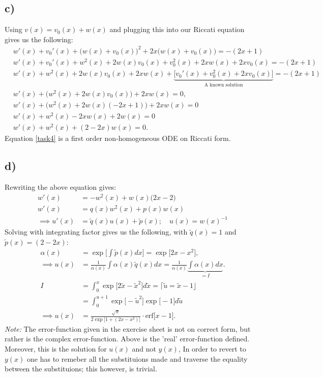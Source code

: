 \documentclass[]{article}
\begin{document}
\subsection*{c)}
Using $v(x) = v_0(x) + w(x)$ and plugging this into our Riccati equation gives us the following:
\begin{align}
    &w'(x) + v_0'(x) + \big(w(x) + v_0(x)\big)^2 + 2x\big(w(x) + v_0(x)\big) = -(2x+1)\nonumber\\
    &w'(x) + v_0'(x) + w^2(x) + 2w(x)v_0(x) + v_0^2(x) + 2xw(x) + 2xv_0(x) = -(2x+1)\nonumber\\
    &w'(x) + w^2(x) + 2w(x)v_0(x) + 2xw(x) + \underbrace{\Big[v_0'(x) + v_0^2(x) + 2xv_0(x)\Big]}_{\text{A known solution}} = -(2x + 1)\nonumber\\
    &w'(x) + \Big(w^2(x) + 2w(x)v_0(x)\Big) + 2xw(x) = 0,\label{task4}\\
    &w'(x) + \Big(w^2(x) + 2w(x)(-2x + 1)\Big) + 2xw(x) = 0\label{sol task 4c}\\
    &w'(x) + w^2(x) - 2xw(x) + 2w(x) = 0\nonumber\\
    &w'(x) + w^2(x) + (2 - 2x)w(x) = 0.\nonumber
\end{align}Equation \eqref{task4} is a first order non-homogeneous ODE on Riccati form.
\subsection*{d)}
Rewriting the above equation gives:
\begin{align*}
    w'(x) &= -w^2(x)+ w(x)\big(2x - 2\big)\\
    w'(x) &= q(x)w^2(x) + p(x)w(x)\\
    \implies u'(x) &= \tilde{q}(x)u(x) + \tilde{p}(x); \quad u(x) = w(x)^{-1}
\end{align*}Solving with integrating factor gives us the following, with $\tilde{q}(x) = 1$ and $\tilde{p}(x) = (2-2x)$:
\begin{align*}
    \alpha(x) &= \exp\Big[\int \tilde{p}(x)dx\Big] = \exp\Big[2x - x^2\Big],\\
    \implies u(x) &= \frac{1}{\alpha(x)}\int \alpha(x)\tilde{q}(x)dx = \frac{1}{\alpha(x)}\underbrace{\int \alpha(x)dx}_{=I}.\\
    I &= \int_0^x \exp\Big[2\tilde{x} - \tilde{x}^2]d\tilde{x} = \lceil \tilde{u} = \tilde{x}-1\rfloor\\
    &= \int_0^{u+1} \exp\Big[-\tilde{u}^2\Big]\exp\Big[-1\Big]d\tilde{u}\\
    \implies u(x) &= \frac{\sqrt{\pi}}{2\exp\Big[1 + (2x - x^2)\Big]}\cdot \text{erf}\big[x -1\big].
\end{align*}\textit{Note:} The error-function given in the exercise sheet is not on correct form, but rather is the complex error-function. Above is the 'real' error-function defined. Moreover, this is the solution for $u(x)$ and not $y(x)$, In order to revert to $y(x)$ one has to remeber all the substituions made and traverse the equality between the substituions; this however, is trivial.
\end{document}
